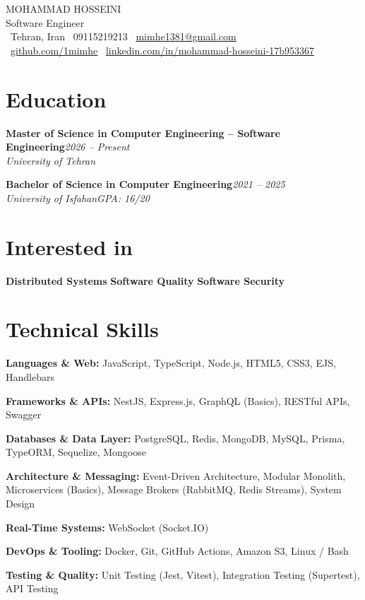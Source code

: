 \documentclass[a4paper,10pt]{article}
\newcommand{\namefont}{\addfontfeatures{LetterSpace=6.0}}
\newcommand{\namefont}{}
\newcommand{\skillcategory}[2]{%
  \noindent\textbf{#1:} #2\par\vspace{1.8pt}%
}
\begin{document}
\begin{center}
  {\fontsize{21pt}{25pt}\selectfont\namefont\color{primary} MOHAMMAD HOSSEINI}\\[5pt]
  {\large\color{accent} Software Engineer}\\[8pt]
  {\small
    \faMapMarker*\ Tehran, Iran \quad\textbar\quad
    \faPhone\ 09115219213 \quad\textbar\quad
    \faEnvelope\ \href{mailto:mimhe1381@gmail.com}{mimhe1381@gmail.com}\\[3pt]
    \faGithub\ \href{https://github.com/1mimhe}{github.com/1mimhe} \quad\textbar\quad
    \faLinkedin\ \href{https://www.linkedin.com/in/mohammad-hosseini-17b953367/}{linkedin.com/in/mohammad-hosseini-17b953367}
  }
\end{center}

\vspace{-4pt}

\section{Education}

\noindent\textbf{Master of Science in Computer Engineering -- Software Engineering}\hfill\textit{\small\color{medgray}2026 -- Present}\\
\textit{\color{medgray}University of Tehran}

\vspace{3pt}

\noindent\textbf{Bachelor of Science in Computer Engineering}\hfill\textit{\small\color{medgray}2021 -- 2025}\\
\textit{\color{medgray}University of Isfahan}\hfill\textit{\small\color{gpacolor}GPA: 16/20}

\section{Interested in}
\noindent\textbf{Distributed Systems} \quad\textbar\quad \textbf{Software Quality} \quad\textbar\quad \textbf{Software Security}

\section{Technical Skills}
\skillcategory{Languages \& Web}{JavaScript, TypeScript, Node.js, HTML5, CSS3, EJS, Handlebars}
\skillcategory{Frameworks \& APIs}{NestJS, Express.js, GraphQL (Basics), RESTful APIs, Swagger}
\skillcategory{Databases \& Data Layer}{PostgreSQL, Redis, MongoDB, MySQL, Prisma, TypeORM, Sequelize, Mongoose}
\skillcategory{Architecture \& Messaging}{Event-Driven Architecture, Modular Monolith, Microservices (Basics), Message Brokers (RabbitMQ, Redis Streams), System Design}
\skillcategory{Real-Time Systems}{WebSocket (Socket.IO)}
\skillcategory{DevOps \& Tooling}{Docker, Git, GitHub Actions, Amazon S3, Linux / Bash}
\skillcategory{Testing \& Quality}{Unit Testing (Jest, Vitest), Integration Testing (Supertest), API Testing}
\end{document}
